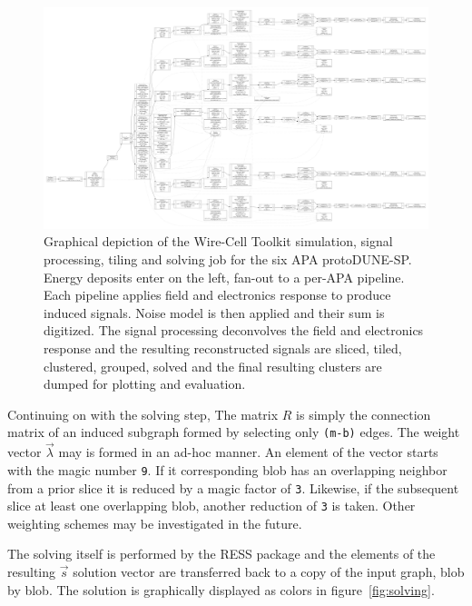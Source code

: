 \documentclass[11pt]{article}
\begin{document}
\begin{figure}[htbp]
\centering
\includegraphics[width=\textwidth]{figs/wct-sim-ideal-sn-nf-sp-img.pdf}
\caption{\label{fig:wctjob}
Graphical depiction of the Wire-Cell Toolkit simulation, signal processing, tiling and solving job for the six APA protoDUNE-SP.  Energy deposits enter on the left, fan-out to a per-APA pipeline.  Each pipeline applies field and electronics response to produce  induced signals.  Noise model is then applied and their sum is digitized.  The signal processing deconvolves the field and electronics response and the resulting reconstructed signals are sliced, tiled, clustered, grouped, solved and the final resulting clusters are dumped for plotting and evaluation.}
\end{figure}


Continuing on with the solving step, The matrix $R$ is simply the connection matrix of an induced subgraph formed by selecting only \texttt{(m-b)} edges.
The weight vector $\vec{\lambda}$ may is formed in an ad-hoc manner. 
An element of the vector starts with the magic number \texttt{9}. 
If it corresponding blob has an overlapping neighbor from a prior slice it is reduced by a magic factor of \texttt{3}. 
Likewise, if the subsequent slice at least one overlapping blob, another reduction of \texttt{3} is taken. 
Other weighting schemes may be investigated in the future.

The solving itself is performed by the RESS package and the elements of the resulting $\vec{s}$ solution vector are transferred back to a copy of the input graph, blob by blob.  The solution is graphically displayed as colors in figure~\ref{fig:solving}.
\end{document}
